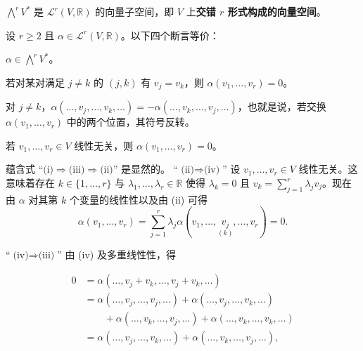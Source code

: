 \begin{remark}

\begin{items}
\item

$ \bigwedge^{r}V^{*} $ 是 $ \mathcal{L}^{r}(V,\mathbb{R}) $ 的向量子空间，即 $ V $ 上\textbf{交错 $ r $ 形式构成的向量空间}。

\item

设 $ r \ge 2 $ 且 $ \alpha \in \mathcal{L}^{r}(V,\mathbb{R}) $。以下四个断言等价：

\begin{subitems}
\item

$ \alpha \in \bigwedge^{r}V^{*} $。

\item

若对某对满足 $ j \ne k $ 的 $ (j,k) $ 有 $ v_{j} = v_{k} $，则 $ \alpha(v_{1},\ldots,v_{r}) = 0 $。

\item

对 $ j \ne k $，$ \alpha(\ldots,v_{j},\ldots,v_{k},\ldots) = -\alpha(\ldots,v_{k},\ldots,v_{j},\ldots) $，也就是说，若交换 $ \alpha(v_{1},\ldots,v_{r}) $ 中的两个位置，其符号反转。

\item

若 $ v_{1},\ldots,v_{r} \in V $ 线性无关，则 $ \alpha(v_{1},\ldots,v_{r}) = 0 $。

\proofhead
蕴含式 “$ \text{(i)}\Rightarrow\text{(iii)}\Rightarrow\text{(ii)} $” 是显然的。
“$ \text{(ii)}\Rightarrow\text{(iv)} $” 设 $ v_{1},\ldots,v_{r} \in V $ 线性无关。这意味着存在 $ k \in \{1,\ldots,r\} $ 与 $ \lambda_{1},\ldots,\lambda_{r} \in \mathbb{R} $ 使得 $ \lambda_{k} = 0 $ 且 $ v_{k} = \sum_{j=1}^{r}\lambda_{j}v_{j} $。现在由 $ \alpha $ 对其第 $ k $ 个变量的线性性以及由 (ii) 可得
\[
\alpha(v_{1},\ldots,v_{r}) = \sum_{j=1}^{r}\lambda_{j}\alpha(v_{1},\ldots,\underset{(k)}{v_{j}},\ldots,v_{r}) = 0.
\]

“$ \text{(iv)}\Rightarrow\text{(iii)} $” 由 (iv) 及多重线性性，得

\begin{equation*}
\begin{aligned}
0 &= \alpha(\ldots,v_{j}+v_{k},\ldots,v_{j}+v_{k},\ldots) \\ &= \alpha(\ldots,v_{j},\ldots,v_{j},\ldots) + \alpha(\ldots,v_{j},\ldots,v_{k},\ldots) \\ &\qquad + \alpha(\ldots,v_{k},\ldots,v_{j},\ldots) + \alpha(\ldots,v_{k},\ldots,v_{k},\ldots) \\ &= \alpha(\ldots,v_{j},\ldots,v_{k},\ldots) + \alpha(\ldots,v_{k},\ldots,v_{j},\ldots),
\end{aligned}
\end{equation*}


\end{subitems}
\end{items}
\end{remark}
